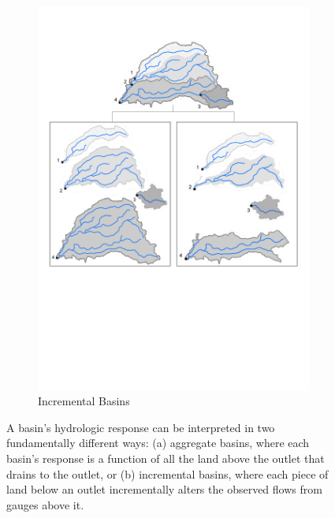 \begin{figure}
\begin{subfigure}{.35\textwidth}
  		\includegraphics[width=\textwidth, trim={15cm 13cm 0 12.65cm}, clip=true]{plots/agg_and_inc_basins.pdf}
  		\caption{Incremental Basins}
  		\label{fig:incbasins}
	\end{subfigure}
	\caption{A basin's hydrologic response can be interpreted in two fundamentally different ways: (a) aggregate basins, where each basin's response is a function of all the land above the outlet that drains to the outlet, or (b) incremental basins, where each piece of land below an outlet incrementally alters the observed flows from gauges above it.}
	\label{fig:aggincbasins}
\end{figure}


